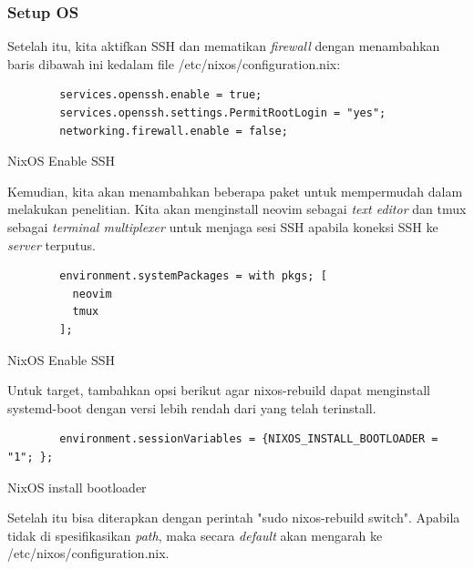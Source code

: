 \documentclass[10pt,twoside]{report}
\newenvironment{code}{\captionsetup{type=listing}}{\vspace{3mm}}
\begin{document}
\begin{adjustwidth}{20pt}{}
	\subsubsection{Setup OS}
	\begin{adjustwidth}{20pt}{}
		Setelah itu, kita aktifkan SSH dan mematikan \textit{firewall} dengan
		menambahkan baris dibawah ini kedalam file /etc/nixos/configuration.nix:
		\begin{code}
			\begin{verbatim}
        services.openssh.enable = true;
        services.openssh.settings.PermitRootLogin = "yes";
        networking.firewall.enable = false;
      \end{verbatim}
			\caption{NixOS Enable SSH}
		\end{code}

		Kemudian, kita akan menambahkan beberapa paket untuk mempermudah dalam
		melakukan penelitian. Kita akan menginstall neovim sebagai \textit{text editor}
		dan tmux sebagai \textit{terminal multiplexer} untuk menjaga sesi SSH apabila koneksi
		SSH ke \textit{server} terputus.

		\begin{code}
			\begin{verbatim}
        environment.systemPackages = with pkgs; [
          neovim
          tmux
        ];
      \end{verbatim}
			\caption{NixOS Enable SSH}
		\end{code}

		Untuk target, tambahkan opsi berikut agar nixos-rebuild dapat menginstall
		systemd-boot dengan versi lebih rendah dari yang telah terinstall.
		\begin{code}
			\begin{verbatim}
        environment.sessionVariables = {NIXOS_INSTALL_BOOTLOADER = "1"; };
      \end{verbatim}
			\caption{NixOS install bootloader}
		\end{code}
		Setelah itu bisa diterapkan dengan perintah "sudo nixos-rebuild switch".
		Apabila tidak di spesifikasikan \textit{path}, maka secara \textit{default}
		akan mengarah ke /etc/nixos/configuration.nix.
	\end{adjustwidth}


\end{adjustwidth}
\end{document}
